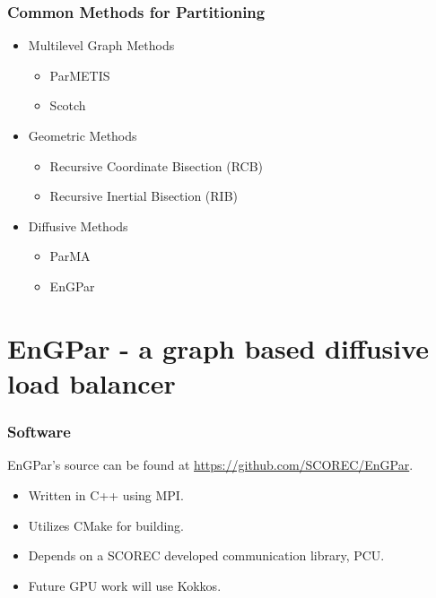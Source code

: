 \documentclass{beamer}
\begin{document}
\begin{frame}
  \frametitle{Common Methods for Partitioning}
  \begin{itemize}
  \item Multilevel Graph Methods %
    \begin{itemize}
    \item ParMETIS
    \item Scotch
    \end{itemize}
  \item Geometric Methods %
    \begin{itemize}
    \item Recursive Coordinate Bisection (RCB)
    \item Recursive Inertial Bisection (RIB)
    \end{itemize}
  \item Diffusive Methods %
    \begin{itemize}
    \item ParMA
    \item EnGPar
    \end{itemize}
  \end{itemize}
\end{frame}

\section{EnGPar - a graph based diffusive load balancer}
\begin{frame}
  \frametitle{Software}
  EnGPar's source can be found at \url{https://github.com/SCOREC/EnGPar}.
  \begin{itemize}
  \item Written in C++ using MPI.
  \item Utilizes CMake for building.
  \item Depends on a SCOREC developed communication library, PCU.
  \item Future GPU work will use Kokkos.
  \end{itemize}
\end{frame}
\end{document}
